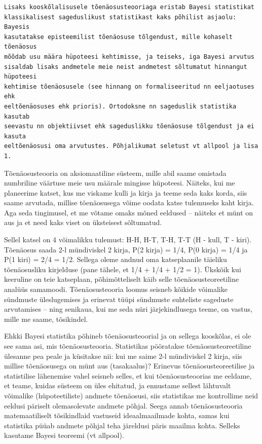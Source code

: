 \documentclass[]{book}
\begin{document}
\begin{verbatim}
Lisaks kooskõlalisusele tõenäosusteooriaga eristab Bayesi statistikat 
klassikalisest sageduslikust statistikast kaks põhilist asjaolu: Bayesis 
kasutatakse episteemilist tõenäosuse tõlgendust, mille kohaselt tõenäosus 
mõõdab usu määra hüpoteesi kehtimisse, ja teiseks, iga Bayesi arvutus 
sisaldab lisaks andmetele meie neist andmetest sõltumatut hinnangut hüpoteesi
kehtimise tõenäosusele (see hinnang on formaliseeritud nn eeljaotuses ehk
eeltõenäosuses ehk prioris). Ortodoksne nn sageduslik statistika kasutab 
seevastu nn objektiivset ehk sageduslikku tõenäosuse tõlgendust ja ei kasuta
eeltõenäosusi oma arvutustes. Põhjalikumat seletust vt allpool ja lisa 1.
\end{verbatim}

Tõenäosusteooria on aksiomaatiline süsteem, mille abil saame omistada
numbriline väärtuse meie usu määrale mingisse hüpoteesi. Näiteks, kui me
planeerime katset, kus me viskame kulli ja kirja ja teeme seda kaks
korda, siis saame arvutada, millise tõenäosusega võime oodata katse
tulemuseks kaht kirja. Aga seda tingimusel, et me võtame omaks mõned
eeldused -- näiteks et münt on aus ja et need kaks viset on üksteisest
sõltumatud.

Sellel katsel on 4 võimalikku tulemust: H-H, H-T, T-H, T-T (H - kull, T
- kiri). Tõenäosus saada 2-l mündiviskel 2 kirja, P(2 kirja) = 1/4, P(0
kirja) = 1/4 ja P(1 kiri) = 2/4 = 1/2. Sellega oleme andnud oma
katseplaanile täieliku tõenäosusliku kirjelduse (pane tähele, et 1/4 +
1/4 + 1/2 = 1). Ükskõik kui keeruline on teie katseplaan,
põhimõtteliselt käib selle tõenäosusteoreetiline analüüs samamoodi.
Tõenäosusteooria loomus seisneb kõikide võimalike sündmuste
üleslugemises ja erinevat tüüpi sündmuste suhteliste sageduste
arvutamises -- ning senikaua, kui me seda nüri järjekindlusega teeme, on
vastus, mille me saame, tõsikindel.

Ehkki Bayesi statistika põhineb tõenäosusteoorial ja on sellega
kooskõlas, ei ole see sama asi, mis tõenäosusteooria. Statistikas
pööratakse tõenäosusteoreetiline ülesanne pea peale ja küsitakse nii:
kui me saime 2-l mündiviskel 2 kirja, siis millise tõenäosusega on münt
aus (tasakaalus)? Erinevus tõenäosusteoreetilise ja statistilise
lähenemise vahel seisneb selles, et kui tõenäosusteoorias me eeldame, et
teame, kuidas süsteem on üles ehitatud, ja ennustame sellest lähtuvalt
võimalike (hüpoteetiliste) andmete tõenäosusi, siis statistikas me
kontrollime neid eeldusi päriselt olemasolevate andmete põhjal. Seega
annab tõenäosusteooria matemaatiliselt tõsikindlaid vastuseid
ideaalmaailmade kohta, samas kui statistika püüab andmete põhjal teha
järeldusi päris maailma kohta. Selleks kasutame Bayesi teoreemi (vt
allpool).
\end{document}
